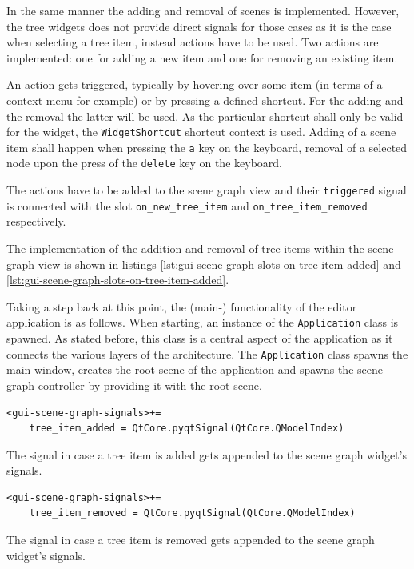 \documentclass[10pt, openright, notitlepage]{scrreprt}
\begin{document}
In the same manner the adding and removal of scenes is implemented. However, the
tree widgets does not provide direct signals for those cases as it is the case
when selecting a tree item, instead actions have to be used. Two actions are
implemented: one for adding a new item and one for removing an existing item.

An action gets triggered, typically by hovering over some item (in terms of a
context menu for example) or by pressing a defined shortcut. For the adding and
the removal the latter will be used. As the particular shortcut shall only be
valid for the widget, the \texttt{WidgetShortcut} shortcut context is used.
Adding of a scene item shall happen when pressing the \texttt{a} key on the keyboard,
removal of a selected node upon the press of the \texttt{delete} key on the keyboard.

The actions have to be added to the scene graph view and their
\texttt{triggered} signal is connected with the slot \texttt{on\_new\_tree\_item}
and \texttt{on\_tree\_item\_removed} respectively.

The implementation of the addition and removal of tree items within the scene
graph view is shown in listings \ref{lst:gui-scene-graph-slots-on-tree-item-added} and
\ref{lst:gui-scene-graph-slots-on-tree-item-added}.

Taking a step back at this point, the (main-) functionality of the editor
application is as follows. When starting, an instance of the
\texttt{Application} class is spawned. As stated before, this class
is a central aspect of the application as it connects the various layers of the
architecture. The \texttt{Application} class spawns the main window, creates
the root scene of the application and spawns the scene graph controller by
providing it with the root scene.

\begin{listing}[H]
\begin{verbatim}
<gui-scene-graph-signals>+=
    tree_item_added = QtCore.pyqtSignal(QtCore.QModelIndex)
\end{verbatim}
\caption{\label{lst:gui-scene-graph-signals-tree-item-removed}
The signal in case a tree item is added gets appended to the scene graph widget's signals.}
\end{listing}
\begin{listing}[H]
\begin{verbatim}
<gui-scene-graph-signals>+=
    tree_item_removed = QtCore.pyqtSignal(QtCore.QModelIndex)
\end{verbatim}
\caption{\label{lst:gui-scene-graph-signals-tree-item-removed}
The signal in case a tree item is removed gets appended to the scene graph widget's signals.}
\end{listing}
\end{document}
